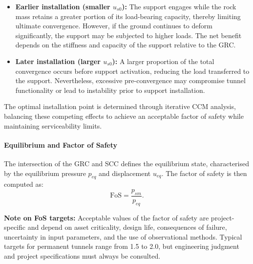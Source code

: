 \begin{itemize}
 \item \textbf{Earlier installation (smaller $u_{s0}$):} The support engages while the rock mass retains a greater portion of its load-bearing capacity, thereby limiting ultimate convergence. However, if the ground continues to deform significantly, the support may be subjected to higher loads. The net benefit depends on the stiffness and capacity of the support relative to the GRC.
 \item \textbf{Later installation (larger $u_{s0}$):} A larger proportion of the total convergence occurs before support activation, reducing the load transferred to the support. Nevertheless, excessive pre-convergence may compromise tunnel functionality or lead to instability prior to support installation.
\end{itemize}

The optimal installation point is determined through iterative CCM analysis, balancing these competing effects to achieve an acceptable factor of safety while maintaining serviceability limits.

\paragraph{Equilibrium and Factor of Safety}
The intersection of the GRC and SCC defines the equilibrium state, characterised by the equilibrium pressure $p_{eq}$ and displacement $u_{eq}$. The factor of safety is then computed as:
\[
\text{FoS} = \frac{p_{sm}}{p_{eq}}.
\]

\textbf{Note on FoS targets:} Acceptable values of the factor of safety are project-specific and depend on asset criticality, design life, consequences of failure, uncertainty in input parameters, and the use of observational methods. Typical targets for permanent tunnels range from 1.5 to 2.0, but engineering judgment and project specifications must always be consulted.


